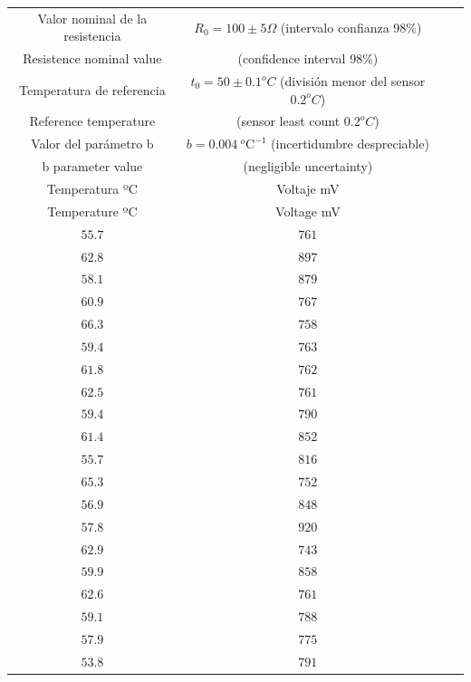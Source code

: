 \begin{table}[h]
\label{tabres}
\centering
\begin{tabular}{cccc}
\hline
Valor nominal de la resistencia  & $R_0=100 \pm 5 \Omega$ (intervalo confianza 98\%)\\
Resistence nominal value&\hspace{2.2cm} (confidence interval 98\%) \\ 
\hline
Temperatura de referencia& $t_0=50\pm 0.1 ^oC$ (división menor del sensor $0.2^oC$) \\
Reference temperature& \hspace{2.2cm}(sensor least count $0.2^oC$)\\
\hline
Valor del parámetro b& $b = 0.004\ ^o\mathrm{C}^{-1}$ (incertidumbre despreciable)\\
b parameter value & \hspace{2.2cm} (negligible uncertainty)\\
\hline
\hline
Temperatura ºC& Voltaje mV\\
Temperature ºC& Voltage mV\\
\hline
 $55.7$&$761$\\
\hline 
 $62.8$&$897$\\
\hline 
 $58.1$&$879$\\
\hline 
 $60.9$&$767$\\
\hline 
 $66.3$&$758$\\
\hline 
 $59.4$&$763$\\
\hline 
 $61.8$&$762$\\
\hline 
 $62.5$&$761$\\
\hline 
 $59.4$&$790$\\
\hline 
 $61.4$&$852$\\
\hline 
 $55.7$&$816$\\
\hline 
 $65.3$&$752$\\
\hline 
 $56.9$&$848$\\
\hline 
 $57.8$&$920$\\
\hline 
 $62.9$&$743$\\
\hline 
 $59.9$&$858$\\
\hline 
 $62.6$&$761$\\
\hline 
 $59.1$&$788$\\
\hline 
 $57.9$&$775$\\
\hline
 $53.8$&$791$\\
\hline
\hline
\end{tabular}
\end{table}
